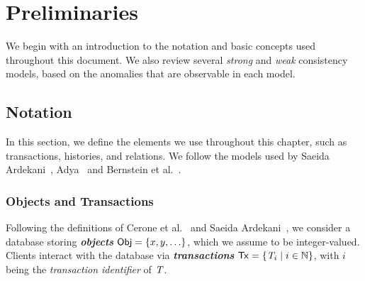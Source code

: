 \cleardoublepage
\chapter{Preliminaries}
\label{chapter:preliminaries}



We begin with an introduction to the notation and basic concepts used throughout this document. We also review several \emph{strong} and \emph{weak} consistency models, based on the anomalies that are observable in each model.

\section{Notation}
\label{sect:notation}

In this section, we define the elements we use throughout this chapter, such as transactions, histories, and relations. We follow the models used by Saeida Ardekani~\citep{ardekani_thesis}, Adya~\citep{adya_thesis} and Bernstein et al.~\citep{bernstein_concurrency}.

\subsection{Objects and Transactions}
\label{sect:obj_tx}

Following the definitions of Cerone et al.~\citep{concur_framework} and Saeida Ardekani~\citep{ardekani_thesis}, we consider a database storing \textbf{\em objects} ${\sf Obj} = \{x, y, \ldots\}$, which we assume to be integer-valued. Clients interact with the database via \textbf{\em transactions} ${\sf Tx} = \{\mathit{T}_i \mid i \in \mathbb{N}\}$, with $i$ being the \emph{transaction identifier} of $\mathit{T}$.


